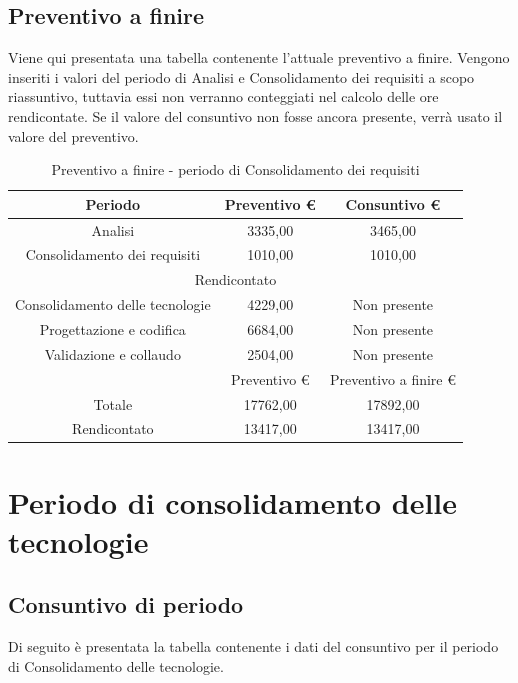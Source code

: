 \documentclass[./PianodiProgetto.tex]{subfiles}
\begin{document}
\subsection{Preventivo a finire}
Viene qui presentata una tabella contenente l'attuale preventivo a finire.
Vengono inseriti i valori del periodo di Analisi e Consolidamento dei requisiti a scopo riassuntivo, tuttavia essi non verranno conteggiati nel calcolo delle ore rendicontate. Se il valore del consuntivo non fosse ancora presente, verrà usato il valore del preventivo.

\begin{table}[H]
	\centering
	\begin{tabular}{|c|c|c|}
		\hline
		Periodo&Preventivo \euro{}&Consuntivo \euro{} \\ \hline
		Analisi&3335,00&3465,00  \\ \hline
		Consolidamento dei requisiti&1010,00&1010,00  \\ \hline
		\multicolumn{3}{|c|}{Rendicontato}  \\ \hline
		Consolidamento delle tecnologie&4229,00&Non presente  \\ \hline
		Progettazione e codifica&6684,00&Non presente  \\ \hline
		Validazione e collaudo&2504,00&Non presente  \\ \hline
		&Preventivo \euro{}&Preventivo a finire \euro{}  \\ \hline
		Totale&17762,00&17892,00 \\ \hline
		Rendicontato&13417,00&13417,00 \\ \hline
	\end{tabular}
	\caption{Preventivo a finire - periodo di Consolidamento dei requisiti}
\end{table}

\section{Periodo di consolidamento delle tecnologie}
\subsection{Consuntivo di periodo}
Di seguito è presentata la tabella contenente i dati del consuntivo per il
periodo di Consolidamento delle tecnologie.
\end{document}
